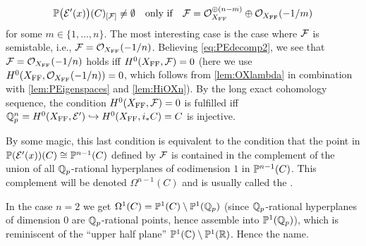 \documentclass[a4paper, 10pt, oneside, DIV=9, chapterprefix=true, numbers=enddot,bibliography=totoc]{scrbook}
\begin{document}
\begin{equation}\label{eq:PEdecomp2}
	\mathbb{P}\big(\mathcal{E}'(x)\big)(C)_{[\mathcal{F}]}\neq \emptyset\quad\text{only if}\quad \mathcal{F}=\mathcal{O}_{X_{\mathrm{FF}}}^{\oplus(n-m)}\oplus \mathcal{O}_{X_{\mathrm{FF}}}(-1/m)
\end{equation}
for some $m\in \{1,\dotsc,n\}$. The most interesting case is the case where $\mathcal{F}$ is semistable, i.e., $\mathcal{F}=\mathcal{O}_{X_{\mathrm{FF}}}(-1/n)$. Believing \cref{eq:PEdecomp2}, we see that $\mathcal{F}=\mathcal{O}_{X_{\mathrm{FF}}}(-1/n)$ holds iff $H^0(X_{\mathrm{FF}},\mathcal{F})=0$ (here we use $H^0(X_{\mathrm{FF}},\mathcal{O}_{X_{\mathrm{FF}}}(-1/n))=0$, which follows from \cref{lem:OXlambda} in combination with \cref{lem:PEigenspaces} and \cref{lem:HiOXn}). By the long exact cohomology sequence, the condition $H^0(X_{\mathrm{FF}},\mathcal{F})=0$ is fulfilled iff $\IQ_p^n=H^0(X_\FFC,\Ee')\monomorphism H^0(X_\FFC,i_*C)=C$ is injective.

By some magic, this last condition is equivalent to the condition that the point in $\mathbb{P}(\mathcal{E}'(x))(C)\cong \mathbb{P}^{n-1}(C)$ defined by $\mathcal{F}$ is contained in the complement of the union of all $\mathbb{Q}_p$-rational hyperplanes of codimension $1$ in $\mathbb{P}^{n-1}(C)$. This complement will be denoted $\Omega^{n-1}(C)$ and is usually called the .
\begin{rem}
	In the case $n=2$ we get $\Omega^1(C)=\mathbb{P}^1(C)\setminus\mathbb{P}^1(\mathbb{Q}_p)$ (since $\mathbb{Q}_p$-rational hyperplanes of dimension $0$ are $\mathbb{Q}_p$-rational points, hence assemble into $\mathbb{P}^1(\mathbb{Q}_p)$), which is reminiscent of the \enquote{upper half plane} $\mathbb{P}^1(\mathbb{C})\setminus \mathbb{P}^1(\mathbb{R})$. Hence the name.
\end{rem}
\end{document}
